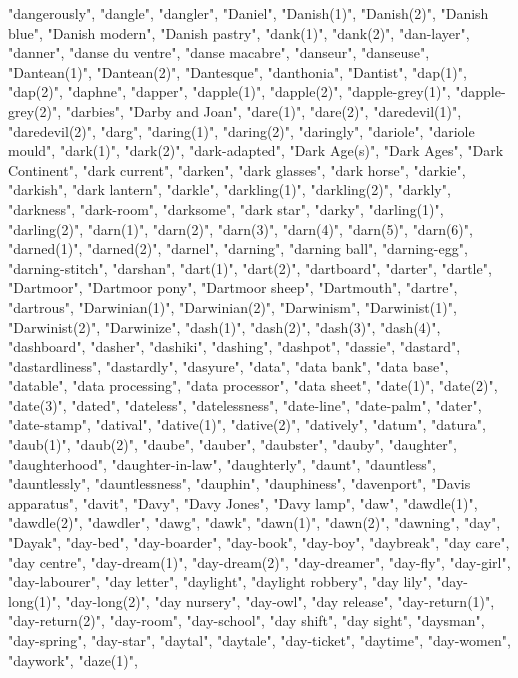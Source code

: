 "dangerously",
"dangle",
"dangler",
"Daniel",
"Danish(1)",
"Danish(2)",
"Danish blue",
"Danish modern",
"Danish pastry",
"dank(1)",
"dank(2)",
"dan-layer",
"danner",
"danse du ventre",
"danse macabre",
"danseur",
"danseuse",
"Dantean(1)",
"Dantean(2)",
"Dantesque",
"danthonia",
"Dantist",
"dap(1)",
"dap(2)",
"daphne",
"dapper",
"dapple(1)",
"dapple(2)",
"dapple-grey(1)",
"dapple-grey(2)",
"darbies",
"Darby and Joan",
"dare(1)",
"dare(2)",
"daredevil(1)",
"daredevil(2)",
"darg",
"daring(1)",
"daring(2)",
"daringly",
"dariole",
"dariole mould",
"dark(1)",
"dark(2)",
"dark-adapted",
"Dark Age(s)",
"Dark Ages",
"Dark Continent",
"dark current",
"darken",
"dark glasses",
"dark horse",
"darkie",
"darkish",
"dark lantern",
"darkle",
"darkling(1)",
"darkling(2)",
"darkly",
"darkness",
"dark-room",
"darksome",
"dark star",
"darky",
"darling(1)",
"darling(2)",
"darn(1)",
"darn(2)",
"darn(3)",
"darn(4)",
"darn(5)",
"darn(6)",
"darned(1)",
"darned(2)",
"darnel",
"darning",
"darning ball",
"darning-egg",
"darning-stitch",
"darshan",
"dart(1)",
"dart(2)",
"dartboard",
"darter",
"dartle",
"Dartmoor",
"Dartmoor pony",
"Dartmoor sheep",
"Dartmouth",
"dartre",
"dartrous",
"Darwinian(1)",
"Darwinian(2)",
"Darwinism",
"Darwinist(1)",
"Darwinist(2)",
"Darwinize",
"dash(1)",
"dash(2)",
"dash(3)",
"dash(4)",
"dashboard",
"dasher",
"dashiki",
"dashing",
"dashpot",
"dassie",
"dastard",
"dastardliness",
"dastardly",
"dasyure",
"data",
"data bank",
"data base",
"datable",
"data processing",
"data processor",
"data sheet",
"date(1)",
"date(2)",
"date(3)",
"dated",
"dateless",
"datelessness",
"date-line",
"date-palm",
"dater",
"date-stamp",
"datival",
"dative(1)",
"dative(2)",
"datively",
"datum",
"datura",
"daub(1)",
"daub(2)",
"daube",
"dauber",
"daubster",
"dauby",
"daughter",
"daughterhood",
"daughter-in-law",
"daughterly",
"daunt",
"dauntless",
"dauntlessly",
"dauntlessness",
"dauphin",
"dauphiness",
"davenport",
"Davis apparatus",
"davit",
"Davy",
"Davy Jones",
"Davy lamp",
"daw",
"dawdle(1)",
"dawdle(2)",
"dawdler",
"dawg",
"dawk",
"dawn(1)",
"dawn(2)",
"dawning",
"day",
"Dayak",
"day-bed",
"day-boarder",
"day-book",
"day-boy",
"daybreak",
"day care",
"day centre",
"day-dream(1)",
"day-dream(2)",
"day-dreamer",
"day-fly",
"day-girl",
"day-labourer",
"day letter",
"daylight",
"daylight robbery",
"day lily",
"day-long(1)",
"day-long(2)",
"day nursery",
"day-owl",
"day release",
"day-return(1)",
"day-return(2)",
"day-room",
"day-school",
"day shift",
"day sight",
"daysman",
"day-spring",
"day-star",
"daytal",
"daytale",
"day-ticket",
"daytime",
"day-women",
"daywork",
"daze(1)",
